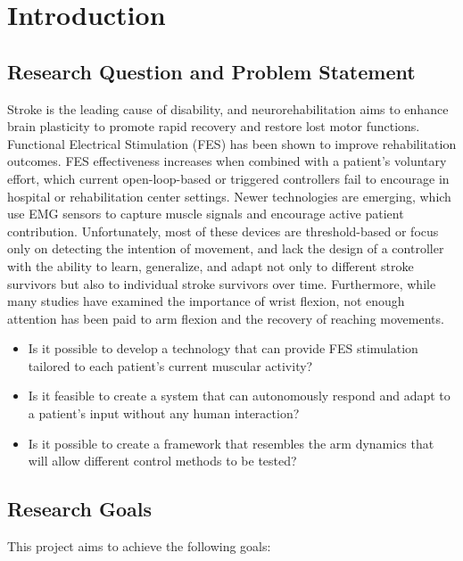 \chapter{Introduction}
\section{Research Question and Problem Statement}

Stroke is the leading cause of disability, and neurorehabilitation aims to enhance brain plasticity to promote rapid recovery and restore lost motor functions. Functional Electrical Stimulation (FES) has been shown to improve rehabilitation outcomes. FES effectiveness increases when combined with a patient's voluntary effort, which current open-loop-based or triggered controllers fail to encourage in hospital or rehabilitation center settings. Newer technologies are emerging, which use EMG sensors to capture muscle signals and encourage active patient contribution. Unfortunately, most of these devices are threshold-based or focus only on detecting the intention of movement, and lack the design of a controller with the ability to learn, generalize, and adapt not only to different stroke survivors but also to individual stroke survivors over time. Furthermore, while many studies have examined the importance of wrist flexion, not enough attention has been paid to arm flexion and the recovery of reaching movements.

\begin{itemize}
    \item Is it possible to develop a technology that can provide FES stimulation tailored to each patient's current muscular activity?
    \item Is it feasible to create a system that can autonomously respond and adapt to a patient's input without any human interaction?
    \item Is it possible to create a framework that resembles the arm dynamics that will allow different control methods to be tested?
\end{itemize}

\section{Research Goals}


This project aims to achieve the following goals:

